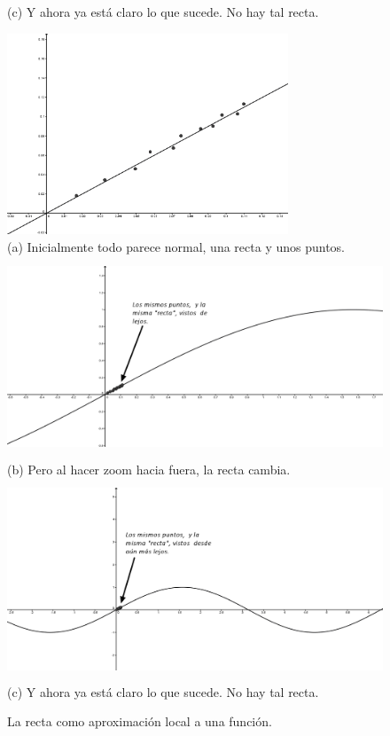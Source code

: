\begin{figure}[p]
\begin{center}
\begin{enColor}
(c) Y ahora ya est\'a claro lo que sucede. No hay tal recta.
\end{enColor}
\begin{bn}
\includegraphics[height=6cm]{../fig/Cap10-EjemploRegresion02a-bn.png}\\
(a) Inicialmente todo parece normal, una recta y unos puntos.\\
\includegraphics[height=6cm]{../fig/Cap10-EjemploRegresion02b-bn.png}\\
(b) Pero al hacer zoom hacia fuera, la recta cambia.
\includegraphics[height=6cm]{../fig/Cap10-EjemploRegresion02c-bn.png}\\
(c) Y ahora ya est\'a claro lo que sucede. No hay tal recta.
\end{bn}
\caption{La recta como aproximación local a una función.}
\label{cap10:fig:RectaComoAproximacionLocal}
\end{center}
\end{figure}

